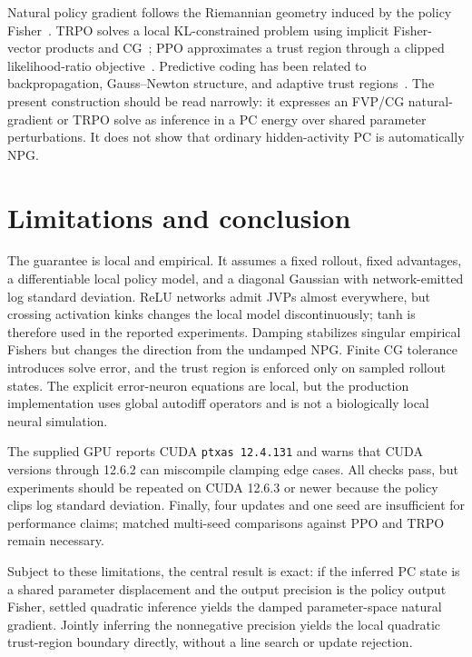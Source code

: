 \documentclass{article}
\newcommand{\code}[1]{\texttt{#1}}
\begin{document}
Natural policy gradient follows the Riemannian geometry induced by the policy Fisher~\citep{kakade2001}. TRPO solves a local KL-constrained problem using implicit Fisher-vector products and CG~\citep{schulman2015}; PPO approximates a trust region through a clipped likelihood-ratio objective~\citep{schulman2017}. Predictive coding has been related to backpropagation, Gauss--Newton structure, and adaptive trust regions~\citep{whittington2017,innocenti2023}. The present construction should be read narrowly: it expresses an FVP/CG natural-gradient or TRPO solve as inference in a PC energy over shared parameter perturbations. It does not show that ordinary hidden-activity PC is automatically NPG.

\section{Limitations and conclusion}

The guarantee is local and empirical. It assumes a fixed rollout, fixed advantages, a differentiable local policy model, and a diagonal Gaussian with network-emitted log standard deviation. ReLU networks admit JVPs almost everywhere, but crossing activation kinks changes the local model discontinuously; tanh is therefore used in the reported experiments. Damping stabilizes singular empirical Fishers but changes the direction from the undamped NPG. Finite CG tolerance introduces solve error, and the trust region is enforced only on sampled rollout states. The explicit error-neuron equations are local, but the production implementation uses global autodiff operators and is not a biologically local neural simulation.

The supplied GPU reports CUDA \code{ptxas 12.4.131} and warns that CUDA versions through 12.6.2 can miscompile clamping edge cases. All checks pass, but experiments should be repeated on CUDA 12.6.3 or newer because the policy clips log standard deviation. Finally, four updates and one seed are insufficient for performance claims; matched multi-seed comparisons against PPO and TRPO remain necessary.

Subject to these limitations, the central result is exact: if the inferred PC state is a shared parameter displacement and the output precision is the policy output Fisher, settled quadratic inference yields the damped parameter-space natural gradient. Jointly inferring the nonnegative precision yields the local quadratic trust-region boundary directly, without a line search or update rejection.
\end{document}
